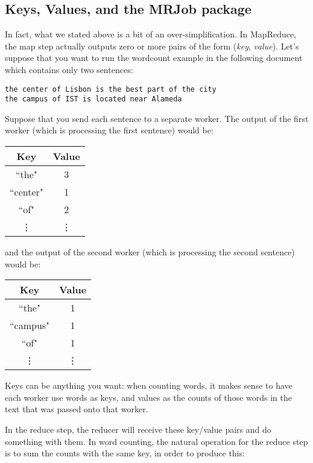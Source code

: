 \subsection{Keys, Values, and the MRJob package}
In fact, what we stated above is a bit of an over-simplification. In MapReduce, the map step actually outputs zero or more pairs of the form (\emph{key}, \emph{value}). Let's suppose that you want to run the wordcount example in the following document which contains only two sentences:

\begin{verbatim}
the center of Lisbon is the best part of the city
the campus of IST is located near Alameda
\end{verbatim}

Suppose that you send each sentence to a separate worker. The output of the first worker (which is processing the first sentence) would be:

\begin{center}
\begin{tabular}{|c|c|}
\hline
Key & Value \\
\hline\hline
``the" & 3 \\
``center" & 1 \\
``of" & 2\\
\vdots & \vdots \\
\end{tabular}
\end{center}

and the output of the second worker (which is processing the second sentence) would be:

\begin{center}
\begin{tabular}{|c|c|}
\hline
Key & Value \\
\hline\hline
``the" & 1 \\
``campus" & 1 \\
``of" & 1\\
\vdots & \vdots \\
\end{tabular}
\end{center}

Keys can be anything you want: when counting words, it makes sense to have each worker use words as keys, and values as the counts of those words in the text that was passed onto that worker.

In the reduce step, the reducer will receive these key/value pairs and do something with them. In word counting, the natural operation for the reduce step is to sum the counts with the same key, in order to produce this:

